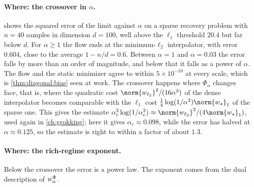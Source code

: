 \begin{refsection}
\paragraph{Where: the crossover in $\alpha$.}  shows the squared error of the limit against $\alpha$ on a sparse recovery problem with $n=40$ samples in dimension $d=100$, well above the $\ell_1$ threshold $20.4$ but far below $d$. For $\alpha\ge1$ the flow ends at the minimum-$\ell_2$ interpolator, with error $0.604$, close to the average $1-n/d=0.6$. Between $\alpha=1$ and $\alpha=0.03$ the error falls by more than an order of magnitude, and below that it falls as a power of $\alpha$. The flow and the static minimizer agree to within $5\times10^{-10}$ at every scale, which is \cref{thm:diagonal:bias} seen at work. The crossover happens where $\Phi_\alpha$ changes face, that is, where the quadratic cost $\norm{\diagwl2}^2/(16\alpha^2)$ of the dense interpolator becomes comparable with the $\ell_1$ cost $\frac14\log(1/\alpha^2)\norm{w_\star}_1$ of the sparse one. This gives the estimate $\alpha_c^2\log(1/\alpha_c^2)\approx\norm{\diagwl2}^2/(4\norm{w_\star}_1)$, used again in \cref{ch:grokking}; here it gives $\alpha_c\approx0.098$, while the error has halved at $\alpha\approx0.125$, so the estimate is right to within a factor of about $1.3$.

\paragraph{Where: the rich-regime exponent.} Below the crossover the error is a power law. The exponent comes from the dual description of $w^\Phi_\alpha$.


\end{refsection}
